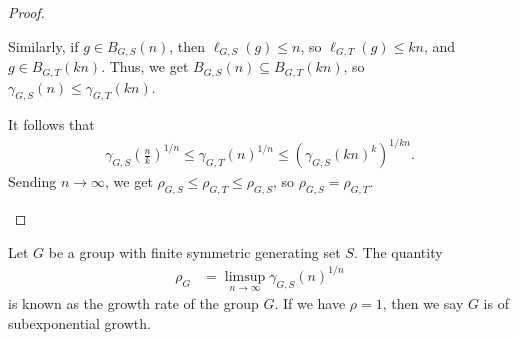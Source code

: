 \begin{proof}
\begin{enumerate}[(1)]
      Similarly, if $g\in B_{G,S}\left(n\right)$, then $\ell_{G,S}\left(g\right)\leq n$, so $\ell_{G,T}\left(g\right) \leq kn$, and $g\in B_{G,T}\left(kn\right)$. Thus, we get $B_{G,S}\left(n\right)\subseteq B_{G,T}\left(kn\right)$, so $\gamma_{G,S}\left(n\right)\leq \gamma_{G,T}\left(kn\right)$.\newline

      It follows that
      \begin{align*}
        \gamma_{G,S}\left(\frac{n}{k}\right)^{1/n} \leq \gamma_{G,T}\left(n\right)^{1/n} \leq \left(\gamma_{G,S}\left(kn\right)^{k}\right)^{1/kn}.
      \end{align*}
      Sending $n\rightarrow\infty$, we get $\rho_{G,S}\leq \rho_{G,T}\leq \rho_{G,S}$, so $\rho_{G,S} = \rho_{G,T}$.
  \end{enumerate}
\end{proof}
\begin{definition}
  Let $G$ be a group with finite symmetric generating set $S$. The quantity
  \begin{align*}
    \rho_{G} &= \limsup_{n\rightarrow\infty}\gamma_{G,S}\left(n\right)^{1/n}
  \end{align*}
  is known as the growth rate of the group $G$. If we have $\rho = 1$, then we say $G$ is of subexponential growth.
\end{definition}
